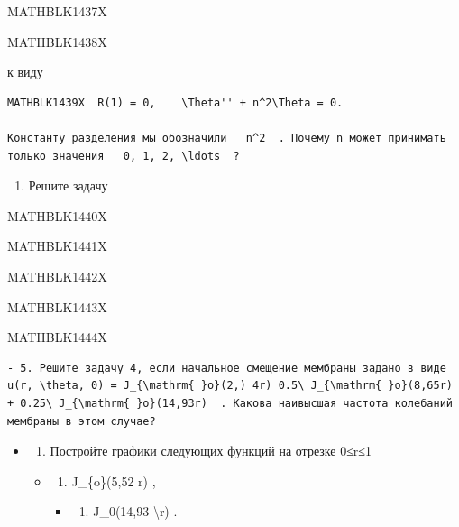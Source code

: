 \documentclass[
]{article}
\providecommand{\tightlist}{%
  \setlength{\itemsep}{0pt}\setlength{\parskip}{0pt}}
\begin{document}
MATHBLK1437X

MATHBLK1438X

к виду

\begin{verbatim}
MATHBLK1439X  R(1) = 0,    \Theta'' + n^2\Theta = 0.

Константу разделения мы обозначили   n^2  . Почему n может принимать только значения   0, 1, 2, \ldots  ?
\end{verbatim}

\begin{enumerate}
\def\labelenumi{\arabic{enumi}.}
\setcounter{enumi}{2}
\tightlist
\item
  Решите задачу
\end{enumerate}

MATHBLK1440X

MATHBLK1441X

MATHBLK1442X

MATHBLK1443X

MATHBLK1444X

\begin{verbatim}
- 5. Решите задачу 4, если начальное смещение мембраны задано в виде   u(r, \theta, 0) = J_{\mathrm{ }o}(2,) 4r) 0.5\ J_{\mathrm{ }o}(8,65r) + 0.25\ J_{\mathrm{ }o}(14,93r)  . Какова наивысшая частота колебаний мембраны в этом случае?
\end{verbatim}

\begin{itemize}
\item
  \begin{enumerate}
  \def\labelenumi{\arabic{enumi}.}
  \setcounter{enumi}{5}
  \tightlist
  \item
    Постройте графики следующих функций на отрезке 0≤r≤1
  \end{enumerate}

  \begin{itemize}
  \item
    \begin{enumerate}
    \def\labelenumi{\alph{enumi})}
    \tightlist
    \item
      J\_\{o\}(5,52 r) ,
    \end{enumerate}

    \begin{itemize}
    \tightlist
    \item
      \begin{enumerate}
      \def\labelenumi{\arabic{enumi})}
      \setcounter{enumi}{5}
      \tightlist
      \item
        J\_0(14,93 \textbackslash r) .
      \end{enumerate}
    \end{itemize}
  \end{itemize}
\end{itemize}
\end{document}
